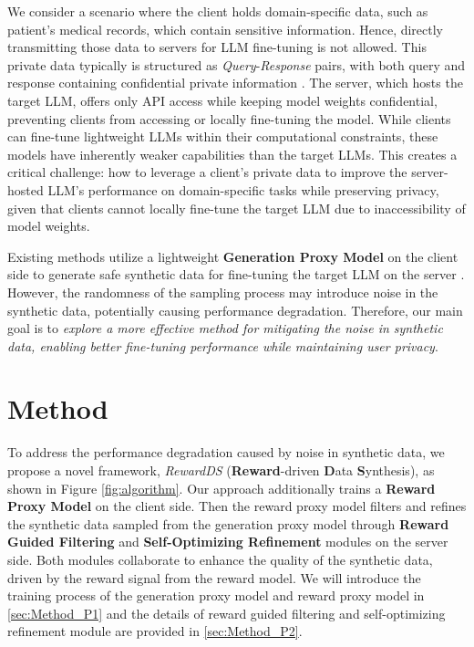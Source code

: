 We consider a scenario where the client holds domain-specific data, such as patient's medical records, which contain sensitive information.  
Hence, directly transmitting those data to servers for LLM fine-tuning is not allowed. 
This private data typically is structured as \textit{Query}-\textit{Response} pairs, with both query and response containing confidential private information \citep{Wang2024KnowledgeSGPS}. 
The server, which hosts the target LLM, offers only API access while keeping model weights confidential, preventing clients from accessing or locally fine-tuning the model. 
While clients can fine-tune lightweight LLMs within their computational constraints, these models have inherently weaker capabilities than the target LLMs. 
This creates a critical challenge: how to leverage a client's private data to improve the server-hosted LLM's performance on domain-specific tasks while preserving privacy, given that clients cannot locally fine-tune the target LLM due to inaccessibility of model weights. 

Existing methods utilize a lightweight \textbf{Generation Proxy Model} on the client side to generate safe synthetic data for fine-tuning the target LLM on the server \citep{yue-etal-2023-synthetic, dayu2024privacy}. 
However, the randomness of the sampling process may introduce noise in the synthetic data, potentially causing performance degradation. 
Therefore, our main goal is to \textit{explore a more effective method for mitigating the noise in synthetic data, enabling better fine-tuning performance while maintaining user privacy}.


\section{Method}
To address the performance degradation caused by noise in synthetic data, we propose a novel framework, \textit{RewardDS} (\textbf{Reward}-driven \textbf{D}ata \textbf{S}ynthesis), as shown in Figure \ref{fig:algorithm}.
Our approach additionally trains a \textbf{Reward Proxy Model} on the client side. 
Then the reward proxy model filters and refines the synthetic data sampled from the generation proxy model through \textbf{Reward Guided Filtering} and \textbf{Self-Optimizing Refinement} modules on the server side. 
Both modules collaborate to enhance the quality of the synthetic data, driven by the reward signal from the reward model.
We will introduce the training process of the generation proxy model and reward proxy model in \cref{sec:Method_P1} and the details of reward guided filtering and self-optimizing refinement module are provided in \cref{sec:Method_P2}.

